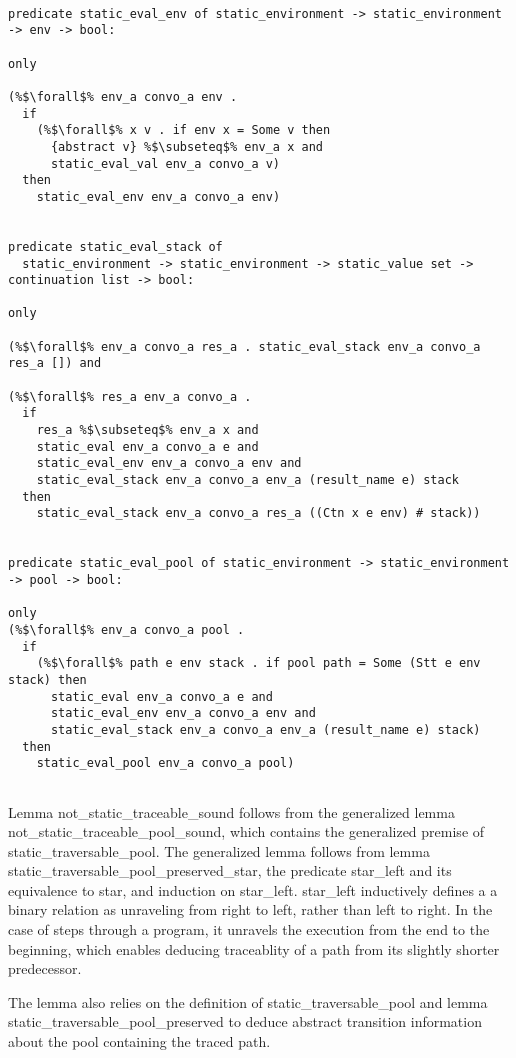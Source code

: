 \documentclass{article}
\begin{document}
\begin{lstlisting}[language=logic, escapechar=\%]

predicate static_eval_env of static_environment -> static_environment -> env -> bool:

only 

(%$\forall$% env_a convo_a env .
  if
    (%$\forall$% x v . if env x = Some v then
      {abstract v} %$\subseteq$% env_a x and
      static_eval_val env_a convo_a v)
  then 
    static_eval_env env_a convo_a env)


predicate static_eval_stack of
  static_environment -> static_environment -> static_value set -> continuation list -> bool:

only 

(%$\forall$% env_a convo_a res_a . static_eval_stack env_a convo_a res_a []) and

(%$\forall$% res_a env_a convo_a . 
  if 
    res_a %$\subseteq$% env_a x and
    static_eval env_a convo_a e and
    static_eval_env env_a convo_a env and
    static_eval_stack env_a convo_a env_a (result_name e) stack 
  then
    static_eval_stack env_a convo_a res_a ((Ctn x e env) # stack))


predicate static_eval_pool of static_environment -> static_environment -> pool -> bool:

only
(%$\forall$% env_a convo_a pool .
  if
    (%$\forall$% path e env stack . if pool path = Some (Stt e env stack) then 
      static_eval env_a convo_a e and
      static_eval_env env_a convo_a env and
      static_eval_stack env_a convo_a env_a (result_name e) stack)
  then 
    static_eval_pool env_a convo_a pool)


\end{lstlisting}
Lemma not\_static\_traceable\_sound follows from the generalized lemma
not\_static\_traceable\_pool\_sound, which contains the generalized premise of
static\_traversable\_pool. The generalized lemma follows from lemma
static\_traversable\_pool\_preserved\_star, the predicate star\_left and its equivalence to star,
and induction on star\_left. star\_left inductively defines a a binary relation as unraveling
from right to left, rather than left to right.  In the case of steps through a program, it
unravels the execution from the end to the beginning, which enables deducing traceablity of a
path from its slightly shorter predecessor.  

The lemma also relies on the definition of static\_traversable\_pool
and lemma static\_traversable\_pool\_preserved to deduce abstract transition information about the
pool containing the traced path.
\end{document}

